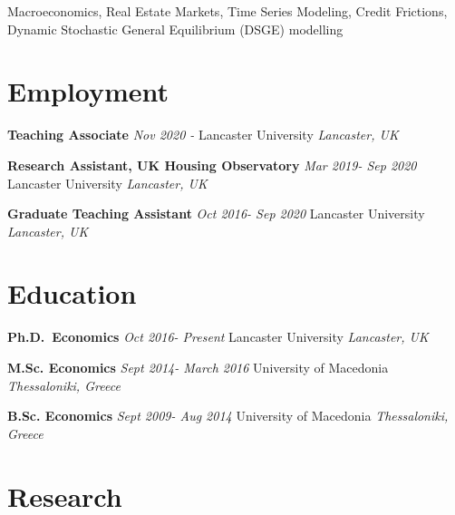 \documentclass[10pt,]{article}
\begin{document}
              Macroeconomics, Real Estate Markets, Time Series Modeling,
              Credit Frictions, Dynamic Stochastic General Equilibrium
              (DSGE) modelling

              \hypertarget{employment}{%
              \section{Employment}\label{employment}}

              \textbf{Teaching Associate} \hfill { \emph{Nov 2020 - } }
              \newline  Lancaster University \hfill { \emph{Lancaster,
              UK} }

              \textbf{Research Assistant, UK Housing Observatory}
              \hfill { \emph{Mar 2019- Sep 2020} } \newline  Lancaster
              University \hfill { \emph{Lancaster, UK} }

              \textbf{Graduate Teaching Assistant} \hfill { \emph{Oct
              2016- Sep 2020} } \newline  Lancaster University \hfill {
              \emph{Lancaster, UK} }

              \hypertarget{education}{%
              \section{Education}\label{education}}

              \vspace{2mm}

              \textbf{Ph.D.~Economics} \hfill { \emph{Oct 2016- Present}
              } \newline  Lancaster University \hfill { \emph{Lancaster,
              UK} }

              \textbf{M.Sc. Economics} \hfill  { \emph{Sept 2014- March
              2016} } \newline  University of Macedonia \hfill {
              \emph{Thessaloniki, Greece} }

              \textbf{B.Sc. Economics} \hfill  { \emph{Sept 2009- Aug
              2014} } \newline  University of Macedonia \hfill {
              \emph{Thessaloniki, Greece} }

              \hypertarget{research}{%
              \section{Research}\label{research}}
\end{document}
